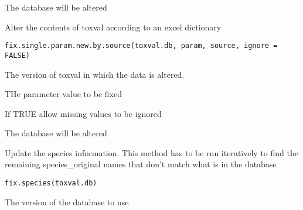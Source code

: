 \documentclass[letterpaper]{book}
\begin{document}
%
\begin{Value}
The database will be altered
\end{Value}
%
\begin{Description}\relax
Alter the contents of toxval according to an excel dictionary
\end{Description}
%
\begin{Usage}
\begin{verbatim}
fix.single.param.new.by.source(toxval.db, param, source, ignore = FALSE)
\end{verbatim}
\end{Usage}
%
\begin{Arguments}
\begin{ldescription}
\item[\code{toxval.db}] The version of toxval in which the data is altered.

\item[\code{param}] THe parameter value to be fixed

\item[\code{ignore}] If TRUE allow missing values to be ignored
\end{ldescription}
\end{Arguments}
%
\begin{Value}
The database will be altered
\end{Value}
%
\begin{Description}\relax
Update the species information. This method has to be run iteratively to find
the remaining species\_original names that don't match what is in the database
\end{Description}
%
\begin{Usage}
\begin{verbatim}
fix.species(toxval.db)
\end{verbatim}
\end{Usage}
%
\begin{Arguments}
\begin{ldescription}
\item[\code{toxval.db}] The version of the database to use
\end{ldescription}
\end{Arguments}
\end{document}
